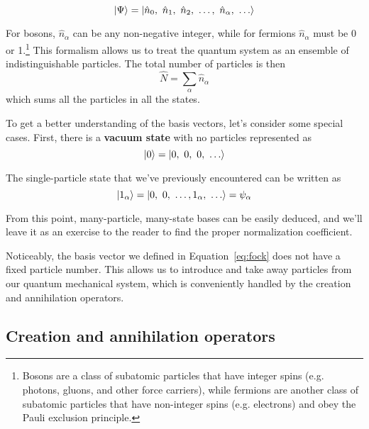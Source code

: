 \begin{tcolorbox} [title=Basis vector] \vspace{-2ex}
	\begin{equation}
		\ket{\Psi} = \ket{\hat{n}_0,\ \hat{n}_1,\ \hat{n}_2,\ \dots,\ \hat{n}_{\alpha},\ \dots} \label{eq:fock}
	\end{equation}
\end{tcolorbox} 

For bosons, $\hat{n}_{\alpha}$ can be any non-negative integer, while for fermions $\hat{n}_{\alpha}$ must be 0 or 1.\footnote{Bosons are a class of subatomic particles that have integer spins (e.g. photons, gluons, and other force carriers), while fermions are another class of subatomic particles that have non-integer spins (e.g. electrons) and obey the Pauli exclusion principle.} This formalism allows us to treat the quantum system as an ensemble of indistinguishable particles. The total number of particles is then
\begin{equation}
	\hat{N} = \sum_{\alpha} \hat{n}_{\alpha}
\end{equation}
which sums all the particles in all the states. \par 

To get a better understanding of the basis vectors, let's consider some special cases. First, there is a \textbf{vacuum state} with no particles represented as
\begin{equation}
	\ket{0} = \ket{0,\ 0,\ 0,\ \dots}
\end{equation}

The single-particle state that we've previously encountered can be written as
\begin{equation}
	\ket{1_{\alpha}} = \ket{0,\ 0,\ \dots, 1_{\alpha},\ \dots} = \psi_{\alpha}
\end{equation}

From this point, many-particle, many-state bases can be easily deduced, and we'll leave it as an exercise to the reader to find the proper normalization coefficient. \par 

Noticeably, the basis vector we defined in Equation~\ref{eq:fock} does not have a fixed particle number. This allows us to introduce and take away particles from our quantum mechanical system, which is conveniently handled by the creation and annihilation operators. \par 

\subsection{Creation and annihilation operators}

